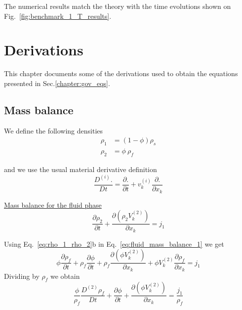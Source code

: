 \documentclass[]{scrreprt}
\begin{document}
The numerical results match the theory with the time evolutions shown on Fig.~\ref{fig:benchmark_1_T_results}.




\appendix

\chapter{Derivations}
\label{chapter:derivations}
This chapter documents some of the derivations used to obtain the equations presented in Sec.\ref{chapter:gov_eqs}.

\section{Mass balance}
\label{sec:mass_balance}
We define the following densities
\begin{subequations}
  \label{eq:rho_1_rho_2}
  \begin{align}
    \rho_1 &= (1-\phi)\rho_s \\
    \rho_2 &= \phi \: \rho_f  
  \end{align}
\end{subequations}

and we use the usual material derivative definition
\begin{equation}
  \label{eq:material_derivative}
  \frac{D^{(i)}.}{D t} = \frac{\partial.}{\partial t} + v^{(i)}_k \frac{\partial.}{\partial x_k}
\end{equation}


\underline{Mass balance for the fluid phase}
\begin{equation}
  \label{eq:fluid_mass_balance_1}
  \frac{\partial \rho_2}{\partial t} + \frac{\partial( \rho_2 V^{(2)}_k)}{\partial x_k}= j_1
\end{equation}

Using Eq.~\ref{eq:rho_1_rho_2}b in Eq.~\ref{eq:fluid_mass_balance_1} we get
\begin{equation}
  \label{eq:fluid_mass_balance_2}
  \phi \frac{\partial \rho_f }{\partial t} + \rho_f\frac{\partial \phi }{\partial t} + \rho_f\frac{\partial( \phi V^{(2)}_k)}{\partial x_k}+ \phi V^{(2)}_k\frac{\partial\rho_f}{\partial x_k} = j_1
\end{equation}
Dividing by $\rho_f$ we obtain
\begin{equation}
  \label{eq:fluid_mass_balance}
  \frac{\phi}{\rho_f} \frac{D^{(2)} \rho_f }{D t} + \frac{\partial \phi }{\partial t} + \frac{\partial( \phi V^{(2)}_k)}{\partial x_k} = \frac{j_1}{\rho_f}
\end{equation}
\end{document}
